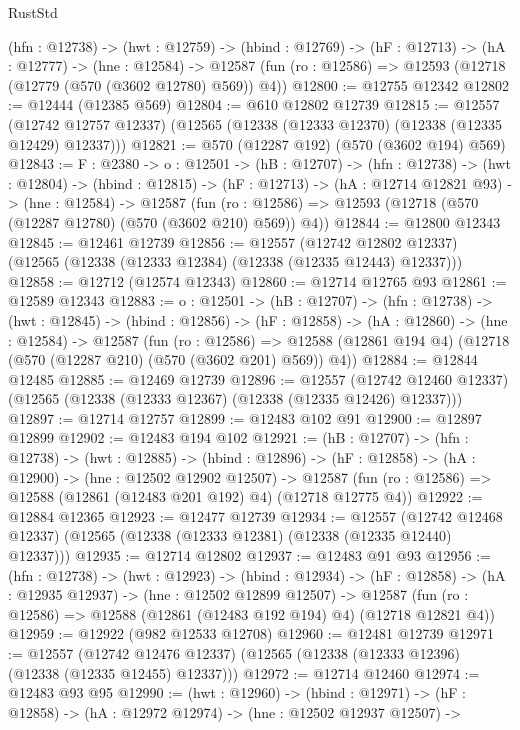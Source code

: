 \begin{lexlean}{RustStd}
\begin{coremodule}
  (hfn : @12738) ->
  (hwt : @12759) ->
  (hbind : @12769) ->
  (hF : @12713) ->
  (hA : @12777) ->
  (hne : @12584) ->
  @12587 (fun (ro : @12586) => @12593 (@12718 (@12779 (@570 (@3602 @12780) @569)) @4))
@12800 := @12755 @12342
@12802 := @12444 (@12385 @569)
@12804 := @610 @12802 @12739
@12815 := @12557
    (@12742 @12757 @12337)
    (@12565 (@12338 (@12333 @12370) (@12338 (@12335 @12429) @12337)))
@12821 := @570 (@12287 @192) (@570 (@3602 @194) @569)
@12843 := {F : @2380} ->
  {o : @12501} ->
  (hB : @12707) ->
  (hfn : @12738) ->
  (hwt : @12804) ->
  (hbind : @12815) ->
  (hF : @12713) ->
  (hA : @12714 @12821 @93) ->
  (hne : @12584) ->
  @12587 (fun (ro : @12586) => @12593 (@12718 (@570 (@12287 @12780) (@570 (@3602 @210) @569)) @4))
@12844 := @12800 @12343
@12845 := @12461 @12739
@12856 := @12557
    (@12742 @12802 @12337)
    (@12565 (@12338 (@12333 @12384) (@12338 (@12335 @12443) @12337)))
@12858 := @12712 (@12574 @12343)
@12860 := @12714 @12765 @93
@12861 := @12589 @12343
@12883 := {o : @12501} ->
  (hB : @12707) ->
  (hfn : @12738) ->
  (hwt : @12845) ->
  (hbind : @12856) ->
  (hF : @12858) ->
  (hA : @12860) ->
  (hne : @12584) ->
  @12587
    (fun (ro : @12586) =>
    @12588 (@12861 @194 @4) (@12718 (@570 (@12287 @210) (@570 (@3602 @201) @569)) @4))
@12884 := @12844 @12485
@12885 := @12469 @12739
@12896 := @12557
    (@12742 @12460 @12337)
    (@12565 (@12338 (@12333 @12367) (@12338 (@12335 @12426) @12337)))
@12897 := @12714 @12757
@12899 := @12483 @102 @91
@12900 := @12897 @12899
@12902 := @12483 @194 @102
@12921 := (hB : @12707) ->
  (hfn : @12738) ->
  (hwt : @12885) ->
  (hbind : @12896) ->
  (hF : @12858) ->
  (hA : @12900) ->
  (hne : @12502 @12902 @12507) ->
  @12587 (fun (ro : @12586) => @12588 (@12861 (@12483 @201 @192) @4) (@12718 @12775 @4))
@12922 := @12884 @12365
@12923 := @12477 @12739
@12934 := @12557
    (@12742 @12468 @12337)
    (@12565 (@12338 (@12333 @12381) (@12338 (@12335 @12440) @12337)))
@12935 := @12714 @12802
@12937 := @12483 @91 @93
@12956 := (hfn : @12738) ->
  (hwt : @12923) ->
  (hbind : @12934) ->
  (hF : @12858) ->
  (hA : @12935 @12937) ->
  (hne : @12502 @12899 @12507) ->
  @12587 (fun (ro : @12586) => @12588 (@12861 (@12483 @192 @194) @4) (@12718 @12821 @4))
@12959 := @12922 (@982 @12533 @12708)
@12960 := @12481 @12739
@12971 := @12557
    (@12742 @12476 @12337)
    (@12565 (@12338 (@12333 @12396) (@12338 (@12335 @12455) @12337)))
@12972 := @12714 @12460
@12974 := @12483 @93 @95
@12990 := (hwt : @12960) ->
  (hbind : @12971) ->
  (hF : @12858) ->
  (hA : @12972 @12974) ->
  (hne : @12502 @12937 @12507) ->

\end{coremodule}
\end{lexlean}
